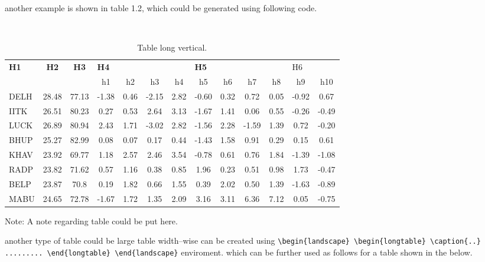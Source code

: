 another example is shown in table 1.2, which could be generated using following code.

\begin{table}[hbt!]
	\centering
	\caption{\centering Table long vertical.}\\ \label{Table 5.4}
	\footnotesize
	\begin{tabular}{l c c c c c c c c c c c c}
			\hline
			\multirow{2}{*}{\textbf{H1}} & \multirow{2}{*}{\textbf{H2}} & \multirow{2}{*}{\textbf{H3}} & \multicolumn{4}{l}{\textbf{H4}}                                              & \multicolumn{4}{l}{\textbf{H5}}                                            & \multicolumn{2}{l}{H6}\\ \cline{4-13} 
    &   &   & h1& h2& h3& h4& h5& h6& h7& h8& h9& h10  \\ \hline
     DELH &  28.48 &  77.13 &  -1.38  &  0.46   &  -2.15 &  2.82 &  -0.60  & 0.32                           &  0.72  &  0.05 &  -0.92 &  0.67  \\
 IITK &  26.51 &  80.23 &  0.27 &  0.53   &  2.64  &  3.13 &  -1.67  & 1.41 &  0.06  &  0.55 &  -0.26 &  -0.49 \\
 LUCK &  26.89 &  80.94 &  2.43   &  1.71   &  -3.02 &  2.82 &  -1.56 & 2.28   &  -1.59 &  1.39 &  0.72  &  -0.20  \\
 BHUP &  25.27 &  82.99 &  0.08   &  0.07   &  0.17  &  0.44 &  -1.43  & 1.58   &  0.91  &  0.29 &  0.15  &  0.61\\
 KHAV &  23.92 &  69.77 &  1.18   &  2.57   &  2.46  &  3.54 &  -0.78  & 0.61   &  0.76  &  1.84 &  -1.39 &  -1.08 \\
 RADP &  23.82 &  71.62 &  0.57   &  1.16   &  0.38  &  0.85 &  1.96   & 0.23   &  0.51  &  0.98 &  1.73  &  -0.47 \\
 BELP &  23.87 &  70.8  &  0.19   &  1.82   &  0.66  &  1.55 &  0.39   & 2.02   &  0.50  &  1.39 &  -1.63 &  -0.89 \\
 MABU &  24.65 &  72.78 &  -1.67  &  1.72   &  1.35  &  2.09 &  3.16   & 3.11   &  6.36  &  7.12 &  0.05  &  -0.75 \\
 
\hline
    \end{tabular}
    
    Note: A note regarding table could be put here.
\end{table} 
%
another type of table could be large table width--wise can be created using \verb|\begin{landscape} \begin{longtable} \caption{..} ......... \end{longtable} \end{landscape}| enviroment. which can be further used as follows for a table shown in the below.
